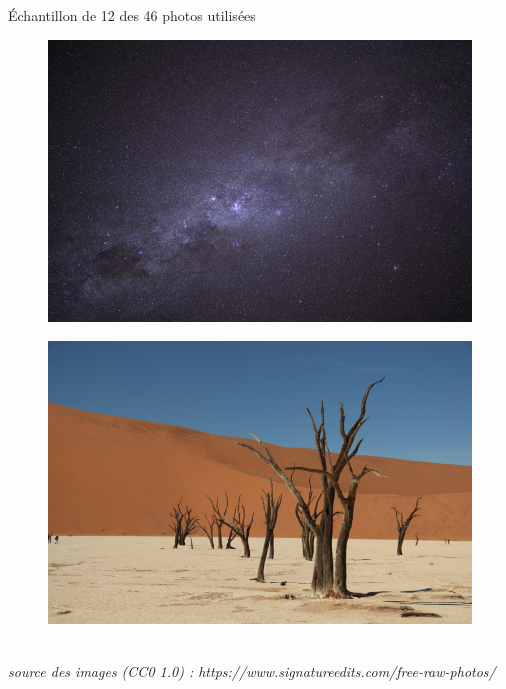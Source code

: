 \documentclass[xcolor=dvipsnames]{beamer}
\begin{document}
\begin{frame}{Échantillon de 12 des 46 photos utilisées}
\begin{minipage}{.23\textwidth}
\begin{figure}
        \end{figure}
        \begin{figure}
            \includegraphics[width=1\linewidth]{photos_utilises/27.jpg}
        \end{figure}
        \begin{figure}
            \includegraphics[width=1\linewidth]{photos_utilises/41.jpg}
        \end{figure}
    \end{minipage}
    \hfill
    \vspace{0.1cm}
    \textit{\tiny \\ \centering source des images (CC0 1.0) : https://www.signatureedits.com/free-raw-photos/}

\end{frame}
\end{document}

